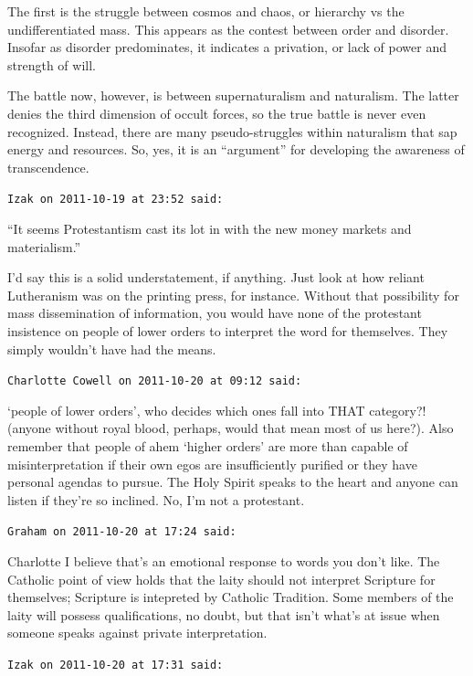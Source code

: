 \begin{footnotesize}
\begin{sffamily}
The first is the struggle between cosmos and chaos, or hierarchy vs the undifferentiated mass. This appears as the contest between order and disorder. Insofar as disorder predominates, it indicates a privation, or lack of power and strength of will.

The battle now, however, is between supernaturalism and naturalism. The latter denies the third dimension of occult forces, so the true battle is never even recognized. Instead, there are many pseudo-struggles within naturalism that sap energy and resources. So, yes, it is an ``argument'' for developing the awareness of transcendence.

\hfill

\texttt{Izak on 2011-10-19 at 23:52 said:}

``It seems Protestantism cast its lot in with the new money markets and materialism.''

I'd say this is a solid understatement, if anything. Just look at how reliant Lutheranism was on the printing press, for instance. Without that possibility for mass dissemination of information, you would have none of the protestant insistence on people of lower orders to interpret the word for themselves. They simply wouldn't have had the means.

\hfill

\texttt{Charlotte Cowell on 2011-10-20 at 09:12 said:}

`people of lower orders', who decides which ones fall into THAT category?! (anyone without royal blood, perhaps, would that mean most of us here?). Also remember that people of ahem `higher orders' are more than capable of misinterpretation if their own egos are insufficiently purified or they have personal agendas to pursue. The Holy Spirit speaks to the heart and anyone can listen if they're so inclined. No, I'm not a protestant.

\hfill

\texttt{Graham on 2011-10-20 at 17:24 said:}

Charlotte I believe that's an emotional response to words you don't like. The Catholic point of view holds that the laity should not interpret Scripture for themselves; Scripture is intepreted by Catholic Tradition. Some members of the laity will possess qualifications, no doubt, but that isn't what's at issue when someone speaks against private interpretation.

\hfill

\texttt{Izak on 2011-10-20 at 17:31 said:}


\end{sffamily}
\end{footnotesize}
